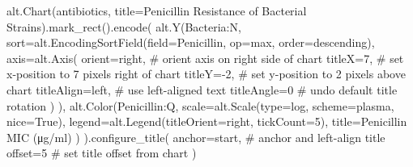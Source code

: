 \documentclass[
  letterpaper,
  DIV=11,
  numbers=noendperiod]{scrartcl}
\newenvironment{Shaded}{\begin{snugshade}}{\end{snugshade}}
\newcommand{\BuiltInTok}[1]{\textcolor[rgb]{0.00,0.23,0.31}{#1}}
\newcommand{\CommentTok}[1]{\textcolor[rgb]{0.37,0.37,0.37}{#1}}
\newcommand{\DecValTok}[1]{\textcolor[rgb]{0.68,0.00,0.00}{#1}}
\newcommand{\NormalTok}[1]{\textcolor[rgb]{0.00,0.23,0.31}{#1}}
\newcommand{\OperatorTok}[1]{\textcolor[rgb]{0.37,0.37,0.37}{#1}}
\newcommand{\StringTok}[1]{\textcolor[rgb]{0.13,0.47,0.30}{#1}}
\newcommand{\VariableTok}[1]{\textcolor[rgb]{0.07,0.07,0.07}{#1}}
\begin{document}
\begin{Shaded}
\begin{Highlighting}[]
\NormalTok{alt.Chart(antibiotics, title}\OperatorTok{=}\StringTok{\textquotesingle{}Penicillin Resistance of Bacterial Strains\textquotesingle{}}\NormalTok{).mark\_rect().encode(}
\NormalTok{    alt.Y(}\StringTok{\textquotesingle{}Bacteria:N\textquotesingle{}}\NormalTok{,}
\NormalTok{      sort}\OperatorTok{=}\NormalTok{alt.EncodingSortField(field}\OperatorTok{=}\StringTok{\textquotesingle{}Penicillin\textquotesingle{}}\NormalTok{, op}\OperatorTok{=}\StringTok{\textquotesingle{}max\textquotesingle{}}\NormalTok{, order}\OperatorTok{=}\StringTok{\textquotesingle{}descending\textquotesingle{}}\NormalTok{),}
\NormalTok{      axis}\OperatorTok{=}\NormalTok{alt.Axis(}
\NormalTok{        orient}\OperatorTok{=}\StringTok{\textquotesingle{}right\textquotesingle{}}\NormalTok{,     }\CommentTok{\# orient axis on right side of chart}
\NormalTok{        titleX}\OperatorTok{=}\DecValTok{7}\NormalTok{,           }\CommentTok{\# set x{-}position to 7 pixels right of chart}
\NormalTok{        titleY}\OperatorTok{={-}}\DecValTok{2}\NormalTok{,          }\CommentTok{\# set y{-}position to 2 pixels above chart}
\NormalTok{        titleAlign}\OperatorTok{=}\StringTok{\textquotesingle{}left\textquotesingle{}}\NormalTok{,  }\CommentTok{\# use left{-}aligned text}
\NormalTok{        titleAngle}\OperatorTok{=}\DecValTok{0}        \CommentTok{\# undo default title rotation}
\NormalTok{      )}
\NormalTok{    ),}
\NormalTok{    alt.Color(}\StringTok{\textquotesingle{}Penicillin:Q\textquotesingle{}}\NormalTok{,}
\NormalTok{      scale}\OperatorTok{=}\NormalTok{alt.Scale(}\BuiltInTok{type}\OperatorTok{=}\StringTok{\textquotesingle{}log\textquotesingle{}}\NormalTok{, scheme}\OperatorTok{=}\StringTok{\textquotesingle{}plasma\textquotesingle{}}\NormalTok{, nice}\OperatorTok{=}\VariableTok{True}\NormalTok{),}
\NormalTok{      legend}\OperatorTok{=}\NormalTok{alt.Legend(titleOrient}\OperatorTok{=}\StringTok{\textquotesingle{}right\textquotesingle{}}\NormalTok{, tickCount}\OperatorTok{=}\DecValTok{5}\NormalTok{),}
\NormalTok{      title}\OperatorTok{=}\StringTok{\textquotesingle{}Penicillin MIC (μg/ml)\textquotesingle{}}
\NormalTok{    )}
\NormalTok{).configure\_title(}
\NormalTok{  anchor}\OperatorTok{=}\StringTok{\textquotesingle{}start\textquotesingle{}}\NormalTok{, }\CommentTok{\# anchor and left{-}align title}
\NormalTok{  offset}\OperatorTok{=}\DecValTok{5}        \CommentTok{\# set title offset from chart}
\NormalTok{)}
\end{Highlighting}
\end{Shaded}
\end{document}
